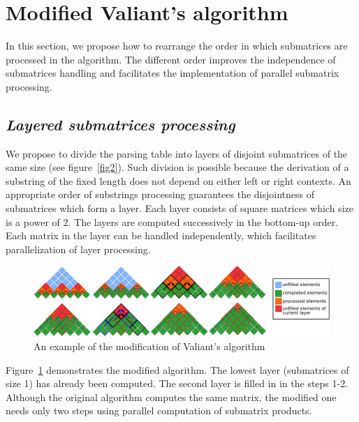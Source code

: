\section{\bf Modified Valiant's algorithm}

In this section, we propose how to rearrange the order in which submatrices are processed in the algorithm.
The different order improves the independence of submatrices handling and facilitates the implementation of parallel submatrix processing.

\subsection{\bf \it Layered submatrices processing}

We propose to divide the parsing table into layers of disjoint submatrices of the same size (see figure~\ref{fig2}).
Such division is possible because the derivation of a substring of the fixed length does not depend on either left or right contexts.
An appropriate order of substrings processing guarantees the disjointness of submatrices which form a layer.
Each layer consists of square matrices which size is a power of 2.
The layers are computed successively in the bottom-up order.
Each matrix in the layer can be handled independently, which facilitates parallelization of layer processing.

\begin{figure}
\vspace{3mm}
 \begin{center}
 \includegraphics[width=12cm]{pictures/modivis2.pdf}
    \caption{An example of the modification of Valiant's algorithm}
    \label{fig4}
 \end{center}
\vspace{-8mm}
\end{figure}

Figure~\ref{fig4} demonstrates the modified algorithm.
The lowest layer (submatrices of size 1) has already been computed.
The second layer is filled in in the steps 1-2.
Although the original algorithm computes the same matrix, the modified one needs only two steps using parallel computation of submatrix products.

